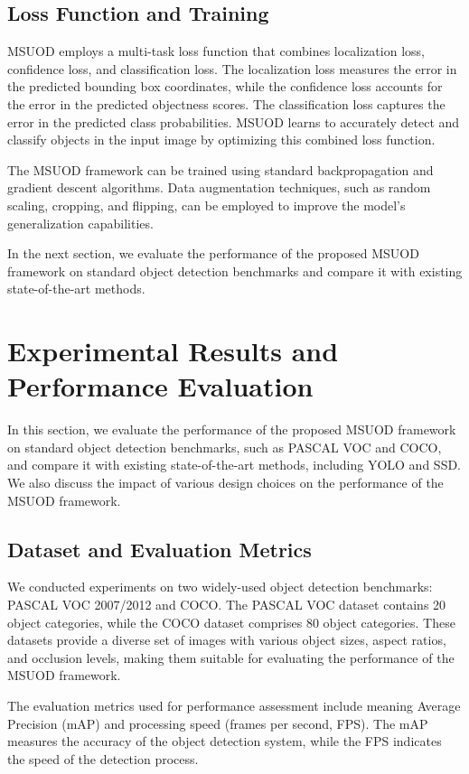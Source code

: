 \documentclass[conference]{IEEEtran}
\begin{document}
\begin{itemize}
\subsection{Loss Function and Training}

MSUOD employs a multi-task loss function that combines localization loss, confidence loss, and classification loss. The localization loss measures the error in the predicted bounding box coordinates, while the confidence loss accounts for the error in the predicted objectness scores. The classification loss captures the error in the predicted class probabilities. MSUOD learns to accurately detect and classify objects in the input image by optimizing this combined loss function.


The MSUOD framework can be trained using standard backpropagation and gradient descent algorithms. Data augmentation techniques, such as random scaling, cropping, and flipping, can be employed to improve the model's generalization capabilities.


In the next section, we evaluate the performance of the proposed MSUOD framework on standard object detection benchmarks and compare it with existing state-of-the-art methods.

\section{Experimental Results and Performance Evaluation}

In this section, we evaluate the performance of the proposed MSUOD framework on standard object detection benchmarks, such as PASCAL VOC and COCO, and compare it with existing state-of-the-art methods, including YOLO and SSD. We also discuss the impact of various design choices on the performance of the MSUOD framework.

\subsection{Dataset and Evaluation Metrics}

We conducted experiments on two widely-used object detection benchmarks: PASCAL VOC 2007/2012 and COCO. The PASCAL VOC dataset contains 20 object categories, while the COCO dataset comprises 80 object categories. These datasets provide a diverse set of images with various object sizes, aspect ratios, and occlusion levels, making them suitable for evaluating the performance of the MSUOD framework.


The evaluation metrics used for performance assessment include meaning Average Precision (mAP) and processing speed (frames per second, FPS). The mAP measures the accuracy of the object detection system, while the FPS indicates the speed of the detection process.


\end{itemize}
\end{document}
